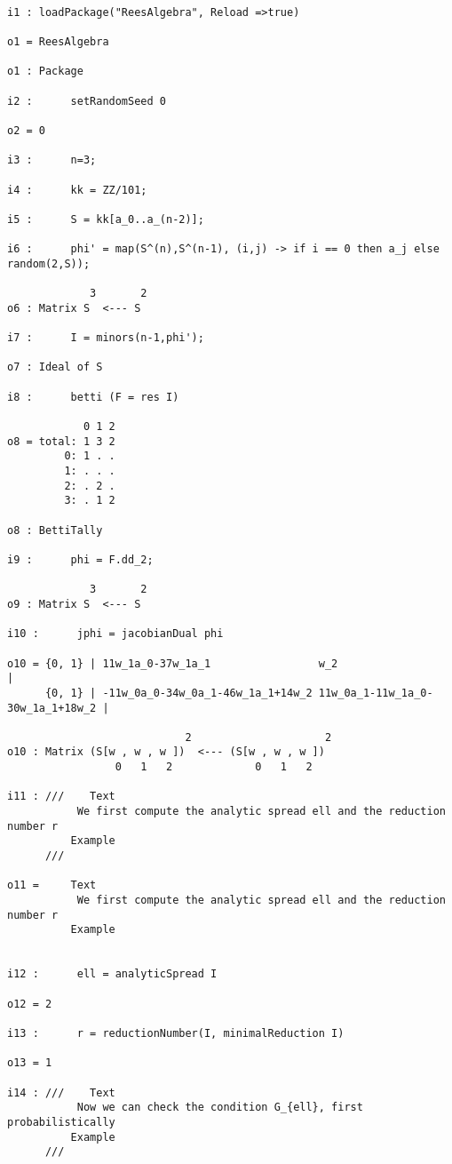 \documentclass[twoside,12pt, leqno]{amsart}
\begin{document}
\begin{verbatim}
 
i1 : loadPackage("ReesAlgebra", Reload =>true)

o1 = ReesAlgebra

o1 : Package

i2 :      setRandomSeed 0

o2 = 0

i3 :      n=3;

i4 :      kk = ZZ/101;

i5 :      S = kk[a_0..a_(n-2)];

i6 :      phi' = map(S^(n),S^(n-1), (i,j) -> if i == 0 then a_j else random(2,S));

             3       2
o6 : Matrix S  <--- S

i7 :      I = minors(n-1,phi');

o7 : Ideal of S

i8 :      betti (F = res I)

            0 1 2
o8 = total: 1 3 2
         0: 1 . .
         1: . . .
         2: . 2 .
         3: . 1 2

o8 : BettiTally

i9 :      phi = F.dd_2;

             3       2
o9 : Matrix S  <--- S

i10 :      jphi = jacobianDual phi

o10 = {0, 1} | 11w_1a_0-37w_1a_1                 w_2                              |
      {0, 1} | -11w_0a_0-34w_0a_1-46w_1a_1+14w_2 11w_0a_1-11w_1a_0-30w_1a_1+18w_2 |

                            2                     2
o10 : Matrix (S[w , w , w ])  <--- (S[w , w , w ])
                 0   1   2             0   1   2

i11 : ///    Text
           We first compute the analytic spread ell and the reduction number r
          Example
      ///    

o11 =     Text
           We first compute the analytic spread ell and the reduction number r
          Example


i12 :      ell = analyticSpread I

o12 = 2

i13 :      r = reductionNumber(I, minimalReduction I)

o13 = 1

i14 : ///    Text
           Now we can check the condition G_{ell}, first probabilistically
          Example
      ///    


\end{verbatim}
\end{document}
